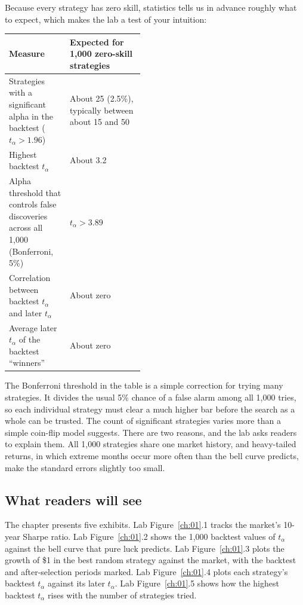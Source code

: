 Because every strategy has zero skill, statistics tells us in advance roughly what to expect, which makes the lab a test of your intuition:

\begin{center}
\small
\begin{tabularx}{0.9\linewidth}{@{}>{\raggedright\arraybackslash}p{0.450\linewidth}>{\raggedright\arraybackslash}X@{}}
\toprule
Measure & Expected for 1,000 zero-skill strategies \\
\midrule
Strategies with a significant alpha in the backtest ($t_\alpha > 1.96$) & About 25 (2.5\%), typically between about 15 and 50 \\
Highest backtest $t_\alpha$ & About 3.2 \\
Alpha threshold that controls false discoveries across all 1,000 (Bonferroni, 5\%) & $t_\alpha > 3.89$ \\
Correlation between backtest $t_\alpha$ and later $t_\alpha$ & About zero \\
Average later $t_\alpha$ of the backtest ``winners'' & About zero \\
\bottomrule
\end{tabularx}
\end{center}

The Bonferroni threshold in the table is a simple correction for trying many strategies. It divides the usual 5\% chance of a false alarm among all 1,000 tries, so each individual strategy must clear a much higher bar before the search as a whole can be trusted. The count of significant strategies varies more than a simple coin-flip model suggests. There are two reasons, and the lab asks readers to explain them. All 1,000 strategies share one market history, and heavy-tailed returns, in which extreme months occur more often than the bell curve predicts, make the standard errors slightly too small.

\subsection*{What readers will see}

The chapter presents five exhibits. Lab Figure~\ref{ch:01}.1 tracks the market's 10-year Sharpe ratio. Lab Figure~\ref{ch:01}.2 shows the 1,000 backtest values of $t_\alpha$ against the bell curve that pure luck predicts. Lab Figure~\ref{ch:01}.3 plots the growth of \$1 in the best random strategy against the market, with the backtest and after-selection periods marked. Lab Figure~\ref{ch:01}.4 plots each strategy's backtest $t_\alpha$ against its later $t_\alpha$. Lab Figure~\ref{ch:01}.5 shows how the highest backtest $t_\alpha$ rises with the number of strategies tried.

